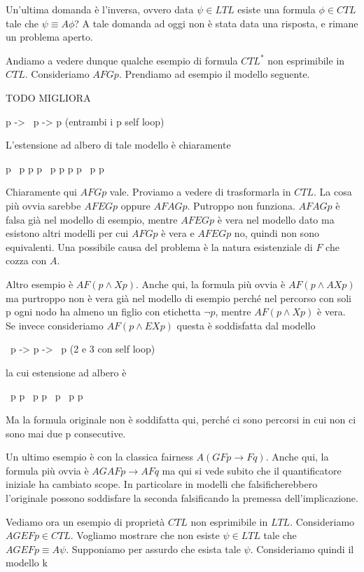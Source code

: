Un'ultima domanda è l'inversa, ovvero data \(\psi \in LTL\) esiste una formula \(\phi \in CTL\) tale che \(\psi \equiv A\phi\)? A tale domanda ad oggi non è stata data una risposta, e rimane un problema aperto.

Andiamo a vedere dunque qualche esempio di formula \(CTL^*\) non esprimibile in \(CTL\)\@.
Consideriamo \(A FGp\). Prendiamo ad esempio il modello seguente.

TODO MIGLIORA 

p -> ~p -> p (entrambi i p self loop)

L'estensione ad albero di tale modello è chiaramente

                   p
                ~p   p
               p  ~p   p
             p   p   ~p p

Chiaramente qui \(A FGp\) vale. Proviamo a vedere di trasformarla in \(CTL\). La cosa più ovvia sarebbe \(A FEGp\) oppure \(A FAGp\). Putroppo non funziona. \(A FAGp\) è falsa già nel modello di esempio, mentre \(A FEGp\) è vera nel modello dato ma esistono altri modelli per cui \(A FGp\) è vera e \(A FEGp\) no, quindi non sono equivalenti. Una possibile causa del problema è la natura esistenziale di \(F\) che cozza con \(A\).

Altro esempio è \(AF(p \land Xp)\). Anche qui, la formula più ovvia è \(AF(p \land AXp)\) ma purtroppo non è vera già nel modello di esempio perché nel percorso con soli p ogni nodo ha almeno un figlio con etichetta \(\neg p\), mentre \(AF(p \land Xp)\) è vera. Se invece consideriamo \(AF (p\land EXp)\) questa è soddisfatta dal modello

~p -> p -> ~p (2 e 3 con self loop)

la cui estensione ad albero è

                   ~p
                    p
                 ~p   p
                ~p  ~p p

Ma la formula originale non è soddifatta qui, perché ci sono percorsi in cui non ci sono mai due p consecutive.

Un ultimo esempio è con la classica fairness \(A(GFp\to Fq)\). Anche qui, la formula più ovvia è \(AG AF p \to AFq\) ma qui si vede subito che il quantificatore iniziale ha cambiato scope. In particolare in modelli che falsificherebbero l'originale possono soddisfare la seconda falsificando la premessa dell'implicazione.

Vediamo ora un esempio di proprietà \(CTL\) non esprimibile in \(LTL\). Consideriamo \(AGEFp \in CTL\). Vogliamo mostrare che non esiste \(\psi \in LTL\) tale che \(AGEFp \equiv A\psi\). Supponiamo per assurdo che esista tale \(\psi\).
Consideriamo quindi il modello k

